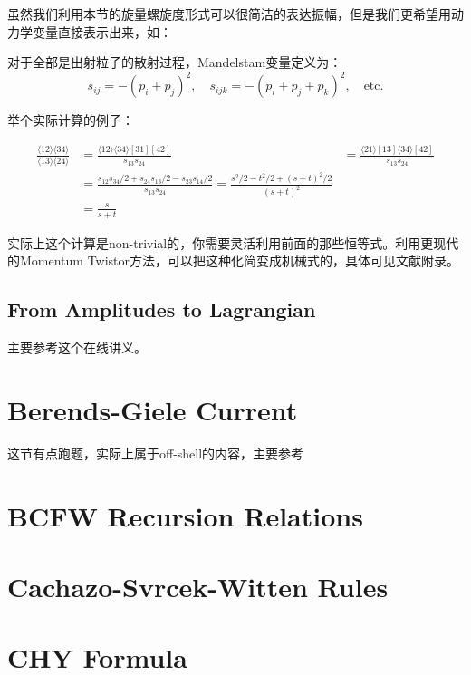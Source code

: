 虽然我们利用本节的旋量螺旋度形式可以很简洁的表达振幅，但是我们更希望用动力学变量直接表示出来，如：
\begin{definition}
	对于全部是出射粒子的散射过程，Mandelstam变量定义为：
	\begin{equation}
		s_{ij}=-(p_i+p_j)^2,\quad s_{ijk}=-(p_i+p_j+p_k)^2,\quad\text{etc}.
	\end{equation}
\end{definition}
举个实际计算的例子：
\begin{example}
	\begin{equation}
		\begin{aligned}
		\frac{\langle12\rangle\langle34\rangle}{\langle13\rangle\langle24\rangle}& =\frac{\langle12\rangle\langle34\rangle[31][42]}{s_{13}s_{24}}&=\frac{\langle21\rangle[13]\langle34\rangle[42]}{s_{13}s_{24}}  \\
		&=\frac{s_{12}s_{34}/2+s_{24}s_{13}/2-s_{23}s_{14}/2}{s_{13}s_{24}}=\frac{s^2/2-t^2/2+(s+t)^2/2}{(s+t)^2} \\
		&=\frac s{s+t}
	\end{aligned}
	\end{equation}
\end{example}
实际上这个计算是non-trivial的，你需要灵活利用前面的那些恒等式。利用更现代的Momentum Twistor方法，可以把这种化简变成机械式的，具体可见文献\cite{Badger:2013gxa}附录。
\subsection{From Amplitudes to Lagrangian}
主要参考这个在线讲义。
\section{Berends-Giele Current}
这节有点跑题，实际上属于off-shell的内容，主要参考\cite{Dixon:1996wi,Mangano:1990by}
\section{BCFW Recursion Relations}
\section{Cachazo-Svrcek-Witten Rules}
\section{CHY Formula}